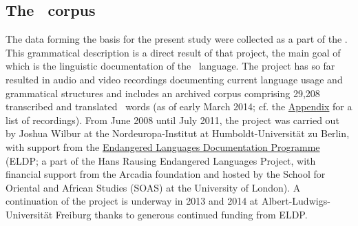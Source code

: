 \subsection{The \PSDP\ corpus}\label{PSDPcorpus}
The data forming the basis for the present study were collected as a part of the \PSDP. This grammatical description is a direct result of that project, the main goal of which is the linguistic documentation of the \PS\ language. The project has so far resulted in audio and video recordings documenting current language usage and grammatical structures and includes an archived corpus comprising 29,208 transcribed and translated \PS\ words (as of early March 2014; %
cf. the \hyperlink{inventoryRef}{Appendix} for a list of recordings). 
From June 2008 until July 2011, the project was carried out by Joshua Wilbur at the Nordeuropa-Institut at Humboldt-Universität zu Berlin, with support from the \href{http://www.hrelp.org/grants/}{Endangered Languages Documentation Programme} (ELDP; a part of the Hans Rausing Endangered Languages Project, with financial support from the Arcadia foundation and hosted by the School for Oriental and African Studies (SOAS) at the University of London). %
A continuation of the project is underway in 2013 and 2014 at Albert-Ludwigs-Universität Freiburg thanks to generous continued funding from ELDP. 

